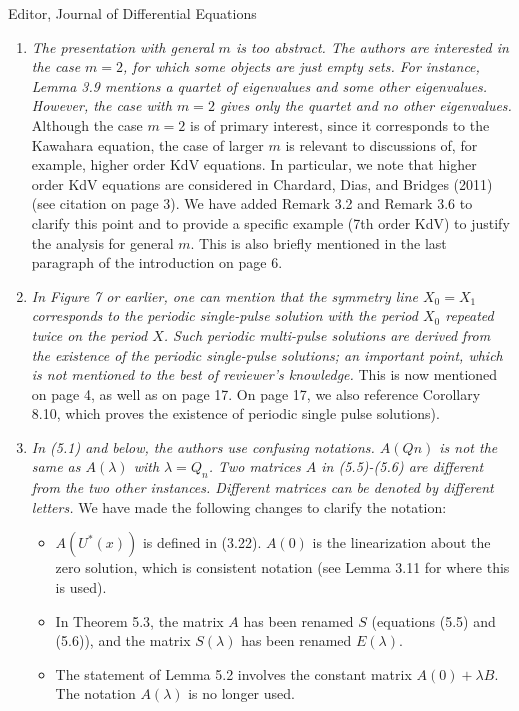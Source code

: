 \documentclass[11pt]{letter}
\begin{document}
\begin{letter}{Editor, Journal of Differential Equations}
\begin{enumerate}
    \item \emph{The presentation with general $m$ is too abstract. The authors are interested in the case $m = 2$, for which some objects are just empty sets. For instance, Lemma 3.9 mentions a quartet of eigenvalues and some other eigenvalues. However, the case with $m = 2$ gives only the quartet and no other eigenvalues.} Although the case $m=2$ is of primary interest, since it corresponds to the Kawahara equation, the case of larger $m$ is relevant to discussions of, for example, higher order KdV equations. In particular, we note that higher order KdV equations are considered in Chardard, Dias, and Bridges (2011) (see citation on page 3). We have added Remark 3.2 and Remark 3.6 to clarify this point and to provide a specific example (7th order KdV) to justify the analysis for general $m$. This is also briefly mentioned in the last paragraph of the introduction on page 6.
    \vspace{4mm}

    \item \emph{In Figure 7 or earlier, one can mention that the symmetry line $X_0 = X_1$ corresponds to the periodic single-pulse solution with the period $X_0$ repeated twice on the period $X$. Such periodic multi-pulse solutions are derived from the existence of the periodic single-pulse solutions; an important point, which is not mentioned to the best of reviewer's knowledge.} This is now mentioned on page 4, as well as on page 17. On page 17, we also reference Corollary 8.10, which proves the existence of periodic single pulse solutions).
    \vspace{4mm}

    \item \emph{In (5.1) and below, the authors use confusing notations. $A(Qn)$ is not the same as $A(\lambda)$ with $\lambda = Q_n$. Two matrices $A$ in (5.5)-(5.6) are different from the two other instances. Different matrices can be denoted by different letters.} We have made the following changes to clarify the notation:
    \begin{itemize}
        \item $A(U^*(x))$ is defined in (3.22). $A(0)$ is the linearization about the zero solution, which is consistent notation (see Lemma 3.11 for where this is used).
        \item In Theorem 5.3, the matrix $A$ has been renamed $S$ (equations (5.5) and (5.6)), and the matrix $S(\lambda)$ has been renamed $E(\lambda)$.
        \item The statement of Lemma 5.2 involves the constant matrix $A(0)+\lambda B$. The notation $A(\lambda)$ is no longer used.
    \end{itemize}
    \vspace{4mm}


\end{enumerate}
\end{letter}
\end{document}

